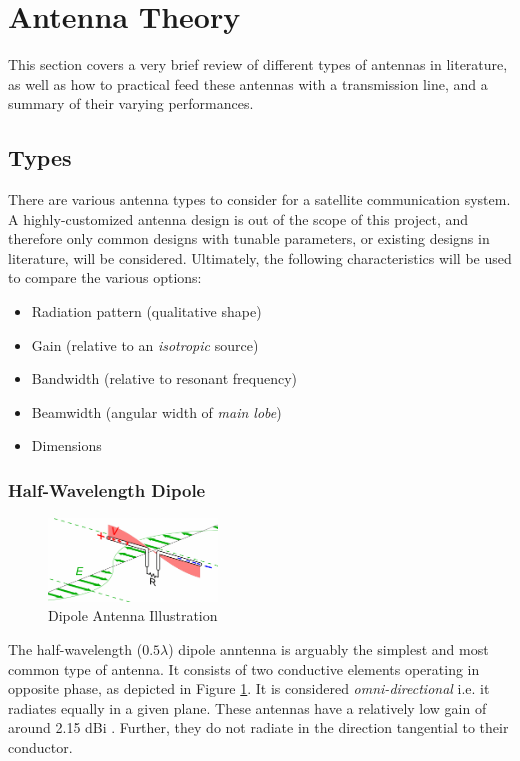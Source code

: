 \graphicspath{{./figures}}

\section{Antenna Theory}\label{sec:antenna_theory}

This section covers a very brief review of different types of antennas in literature, as well as how to practical feed these antennas with a transmission line, and a summary of their varying performances.

\subsection{Types}\label{sec:antenna_types}
There are various antenna types to consider for a satellite communication system. A highly-customized antenna design is out of the scope of this project, and therefore only common designs with tunable parameters, or existing designs in literature, will be considered. Ultimately, the following characteristics will be used to compare the various options:
\begin{itemize}
    \item Radiation pattern (qualitative shape)
    \item Gain (relative to an \textit{isotropic} source) 
    \item Bandwidth (relative to resonant frequency)
    \item Beamwidth (angular width of \textit{main lobe})
    \item Dimensions
\end{itemize}

\subsubsection{Half-Wavelength Dipole}
\begin{figure}[!htb]
  \centering
  \includegraphics[width=0.4\textwidth]{dipole}
  \caption{Dipole Antenna Illustration \cite{site-designingDipole}}
  \label{fig:dipole}
\end{figure}

The half-wavelength ($0.5 \lambda$) dipole anntenna is arguably the simplest and most common type of antenna. It consists of two conductive elements operating in opposite phase, as depicted in Figure \ref{fig:dipole}. It is considered \textit{omni-directional} i.e. it radiates equally in a given plane. These antennas have a relatively low gain of around 2.15 dBi \cite{site-antennaTheory}. Further, they do not radiate in the direction tangential to their conductor.

